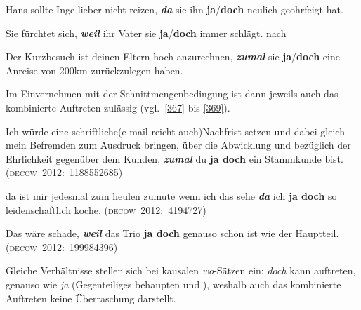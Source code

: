 \begin{exe}
	\ex\label{364}
	Hans sollte Inge lieber nicht reizen, \textit{\textbf{da}} sie ihn \textbf{ja}/\textbf{doch} neulich geohrfeigt hat.
\end{exe}
	
\begin{exe}
	\ex\label{365} 
	Sie fürchtet sich, \textit{\textbf{weil}} ihr Vater sie \textbf{ja}/\textbf{doch} immer schlägt.
	\newline
	\hbox{}\hfill\hbox{nach \citet[77/81]{Borst1985}}
\end{exe}

\begin{exe}
	\ex\label{366} 
	Der Kurzbesuch ist deinen Eltern hoch anzurechnen, \textit{\textbf{zumal}} sie \textbf{ja}/\textbf{doch} eine Anreise von 200km zurückzulegen haben.
\end{exe}
Im Einvernehmen mit der Schnittmengenbedingung ist dann jeweils auch das kombinierte Auftreten zulässig (vgl.\ \ref{367} bis \ref{369}).

\begin{exe}
	\ex\label{367} 

	Ich würde eine schriftliche(e-mail reicht auch)Nachfrist setzen und dabei gleich mein Befremden zum Ausdruck bringen, über die Abwicklung und 				bezüglich der Ehrlichkeit gegenüber dem Kunden, \textbf{\textit{zumal}} du \textbf{ja doch} ein Stammkunde bist.
	\hfill\hbox{\scshape(decow 2012: 1188552685)}
\end{exe}

\begin{exe}
	\ex\label{368} 
	da ist mir jedesmal zum heulen zumute wenn ich das sehe \textbf{\textit{da}} ich \textbf{ja doch} so leidenschaftlich koche.	
	\hfill\hbox{\scshape(decow 2012: 4194727)}
\end{exe}									                                 

\begin{exe}
	\ex\label{369} 
	Das wäre schade, \textbf{\textit{weil}} das Trio \textbf{ja doch} genauso schön ist wie der Hauptteil.\linebreak\hbox{}\hfill\hbox{\scshape(decow 2012: 199984396)}
\end{exe}		                                       
Gleiche Verhältnisse stellen sich bei kausalen \textit{wo}-Sätzen ein: \textit{doch} kann auftreten, genauso wie \textit{ja} (Gegenteiliges behaupten \citealt[63]{Thurmair1989} und \citealt[213]{Rinas2006}), weshalb auch das kombinierte Auftreten keine Überraschung darstellt.

